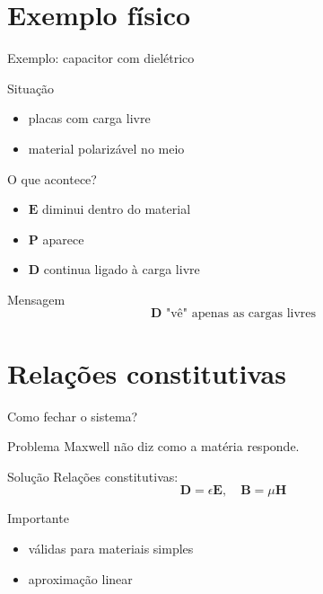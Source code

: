 \documentclass[aspectratio=169]{beamer}
\begin{document}
\section{Exemplo físico}

\begin{frame}{Exemplo: capacitor com dielétrico}

\begin{block}{Situação}
\begin{itemize}
\item placas com carga livre
\item material polarizável no meio
\end{itemize}
\end{block}

\pause

\begin{block}{O que acontece?}
\begin{itemize}
\item \(\mathbf{E}\) diminui dentro do material
\item \(\mathbf{P}\) aparece
\item \(\mathbf{D}\) continua ligado à carga livre
\end{itemize}
\end{block}

\pause

\begin{alertblock}{Mensagem}
\[
\mathbf{D} \text{ "vê" apenas as cargas livres}
\]
\end{alertblock}

\end{frame}


\section{Relações constitutivas}

\begin{frame}{Como fechar o sistema?}

\begin{block}{Problema}
Maxwell não diz como a matéria responde.
\end{block}

\pause

\begin{block}{Solução}
Relações constitutivas:
\begin{equation}
\mathbf{D}=\epsilon \mathbf{E}, \quad
\mathbf{B}=\mu \mathbf{H}
\end{equation}
\end{block}

\pause

\begin{alertblock}{Importante}
\begin{itemize}
\item válidas para materiais simples
\item aproximação linear
\end{itemize}
\end{alertblock}

\end{frame}
\end{document}
